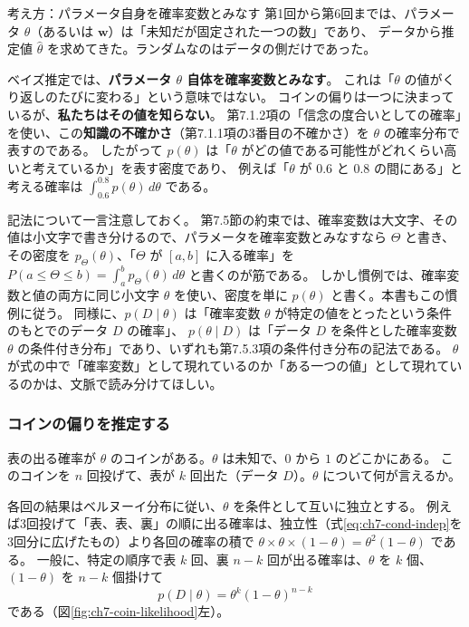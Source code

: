 \begin{itembox}[l]{考え方：パラメータ自身を確率変数とみなす}
第1回から第6回までは、パラメータ $\theta$（あるいは $\bm{w}$）は「未知だが固定された一つの数」であり、
データから推定値 $\hat{\theta}$ を求めてきた。ランダムなのはデータの側だけであった。

ベイズ推定では、\textbf{パラメータ $\theta$ 自体を確率変数とみなす}。
これは「$\theta$ の値がくり返しのたびに変わる」という意味ではない。
コインの偏りは一つに決まっているが、\textbf{私たちはその値を知らない}。
第7.1.2項の「信念の度合いとしての確率」を使い、この\textbf{知識の不確かさ}（第7.1.1項の3番目の不確かさ）を $\theta$ の確率分布で表すのである。
したがって $p(\theta)$ は「$\theta$ がどの値である可能性がどれくらい高いと考えているか」を表す密度であり、
例えば「$\theta$ が $0.6$ と $0.8$ の間にある」と考える確率は $\int_{0.6}^{0.8} p(\theta)\,d\theta$ である。
\end{itembox}

記法について一言注意しておく。
第7.5節の約束では、確率変数は大文字、その値は小文字で書き分けるので、パラメータを確率変数とみなすなら $\Theta$ と書き、
その密度を $p_\Theta(\theta)$、「$\Theta$ が $[a, b]$ に入る確率」を $P(a \leq \Theta \leq b) = \int_a^b p_\Theta(\theta)\,d\theta$ と書くのが筋である。
しかし慣例では、確率変数と値の両方に同じ小文字 $\theta$ を使い、密度を単に $p(\theta)$ と書く。本書もこの慣例に従う。
同様に、$p(D \mid \theta)$ は「確率変数 $\theta$ が特定の値をとったという条件のもとでのデータ $D$ の確率」、
$p(\theta \mid D)$ は「データ $D$ を条件とした確率変数 $\theta$ の条件付き分布」であり、いずれも第7.5.3項の条件付き分布の記法である。
$\theta$ が式の中で「確率変数」として現れているのか「ある一つの値」として現れているのかは、文脈で読み分けてほしい。

\subsubsection{コインの偏りを推定する}

表の出る確率が $\theta$ のコインがある。$\theta$ は未知で、$0$ から $1$ のどこかにある。
このコインを $n$ 回投げて、表が $k$ 回出た（データ $D$）。$\theta$ について何が言えるか。

各回の結果はベルヌーイ分布に従い、$\theta$ を条件として互いに独立とする。
例えば3回投げて「表、表、裏」の順に出る確率は、独立性（式\eqref{eq:ch7-cond-indep}を3回分に広げたもの）より各回の確率の積で
$\theta \times \theta \times (1 - \theta) = \theta^2(1 - \theta)$ である。
一般に、特定の順序で表 $k$ 回、裏 $n - k$ 回が出る確率は、$\theta$ を $k$ 個、$(1 - \theta)$ を $n - k$ 個掛けて
\begin{equation}
  p(D \mid \theta) = \theta^k (1 - \theta)^{n - k}
  \label{eq:ch7-coin-lik}
\end{equation}
である（図\ref{fig:ch7-coin-likelihood}左）。

